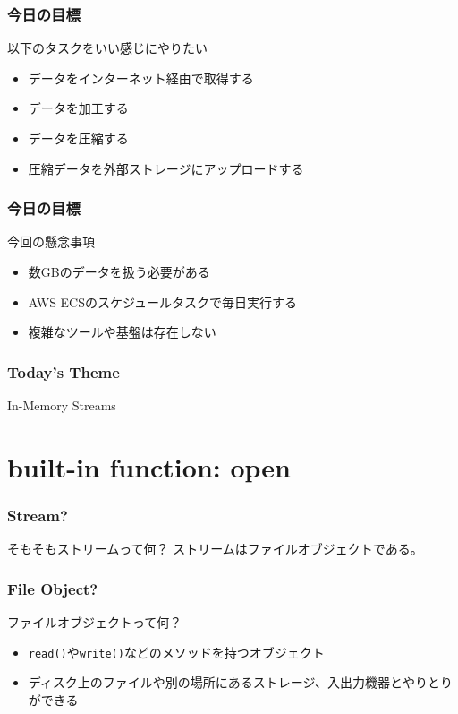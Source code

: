 \documentclass[aspectratio=169,dvipdfmx,14pt,notheorems]{beamer}
\theoremstyle{definition}
\begin{document}
\begin{frame}\frametitle{今日の目標}
\begin{block}{以下のタスクをいい感じにやりたい}
\begin{itemize}
\item データをインターネット経由で取得する
\item データを加工する
\item データを圧縮する
\item 圧縮データを外部ストレージにアップロードする
\end{itemize}
\end{block}
\end{frame}

\begin{frame}\frametitle{今日の目標}
\begin{alertblock}{今回の懸念事項}
\begin{itemize}
\item 数GBのデータを扱う必要がある
\item AWS ECSのスケジュールタスクで毎日実行する
\item 複雑なツールや基盤は存在しない
\end{itemize}
\end{alertblock}
\end{frame}

\begin{frame}\frametitle{Today's Theme}
\begin{center}
\huge{In-Memory Streams}
\end{center}
\end{frame}

\section{built-in function: open}

\begin{frame}\frametitle{Stream?}

\begin{block}{そもそもストリームって何？}
ストリームはファイルオブジェクトである。
\end{block}

\end{frame}

\begin{frame}\frametitle{File Object?}

\begin{block}{ファイルオブジェクトって何？}
\begin{itemize}
\item \texttt{read()}や\texttt{write()}などのメソッドを持つオブジェクト
\item ディスク上のファイルや別の場所にあるストレージ、入出力機器とやりとりができる
\end{itemize}
\end{block}

\end{frame}
\end{document}

